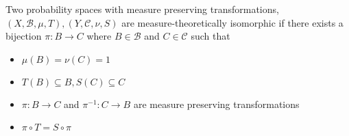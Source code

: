 \documentclass[11pt]{article}
\newenvironment{defin}
	{\begin{mdframed}[backgroundcolor=white, roundcorner=5pt, linewidth=1pt]}
	{\end{mdframed}}
\newcommand{\mdf}[1]{{\color{red} #1}}
\begin{document}
\begin{defin}
	Two probability spaces with measure preserving transformations, $(X,\mathcal{B},\mu,T),(Y,\mathcal{C}, \nu, S)$ are \mdf{measure-theoretically isomorphic} if there exists a bijection $\pi:B\to C$ where $B\in\mathcal{B}$ and $C\in\mathcal{C}$ such that
	\begin{itemize}
		\item $\mu(B)=\nu(C)=1$
		\item $T(B)\subseteq B, S(C)\subseteq C$
		\item $\pi: B\to C$ and $\pi^{-1}:C\to B$ are measure preserving transformations
		\item $\pi\circ T = S\circ\pi$
		\begin{figure}[H]
			\centering
		\end{figure}	
	\end{itemize}
	

\end{defin}
\end{document}
